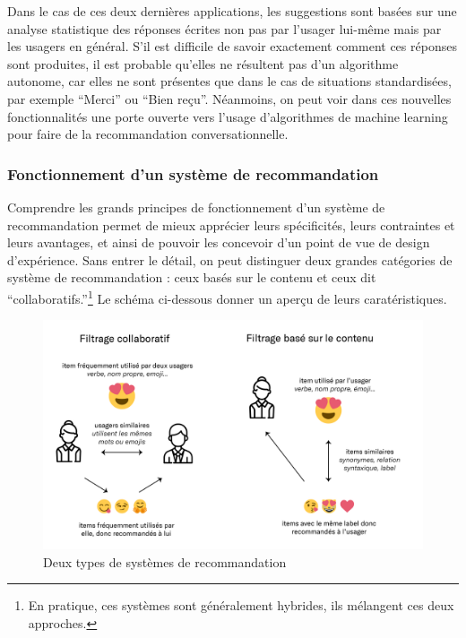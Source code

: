 \documentclass[]{article}
\begin{document}
Dans le cas de ces deux dernières applications, les suggestions sont
basées sur une analyse statistique des réponses écrites non pas par
l'usager lui-même mais par les usagers en général. S'il est difficile de
savoir exactement comment ces réponses sont produites, il est probable
qu'elles ne résultent pas d'un algorithme autonome, car elles ne sont
présentes que dans le cas de situations standardisées, par exemple
``Merci'' ou ``Bien reçu''. Néanmoins, on peut voir dans ces nouvelles
fonctionnalités une porte ouverte vers l'usage d'algorithmes de machine
learning pour faire de la recommandation conversationnelle.

\hypertarget{fonctionnement-dun-systuxe8me-de-recommandation}{%
\subsubsection{Fonctionnement d'un système de
recommandation}\label{fonctionnement-dun-systuxe8me-de-recommandation}}

Comprendre les grands principes de fonctionnement d'un système de
recommandation permet de mieux apprécier leurs spécificités, leurs
contraintes et leurs avantages, et ainsi de pouvoir les concevoir d'un
point de vue de design d'expérience. Sans entrer le détail, on peut
distinguer deux grandes catégories de système de recommandation : ceux
basés sur le contenu et ceux dit ``collaboratifs.''\footnote{En
  pratique, ces systèmes sont généralement hybrides, ils mélangent ces
  deux approches.} Le schéma ci-dessous donner un aperçu de leurs
caratéristiques.

\begin{figure}
\centering
\includegraphics{./tex2pdf.15892/734eb3977aec2f5d5847ce3bde5b018c6fe2c10c.png}
\caption{Deux types de systèmes de recommandation}
\end{figure}
\end{document}
